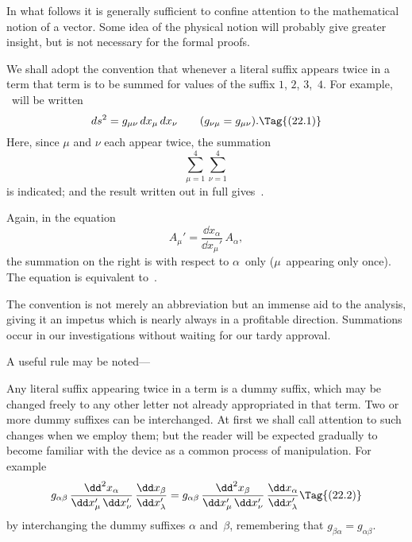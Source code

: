 \documentclass[12pt]{book}
\begin{document}
In what follows it is generally sufficient to confine attention to the mathematical
notion of a vector. Some idea of the physical notion will probably
give greater insight, but is not necessary for the formal proofs.

%

We shall adopt the convention that whenever a literal suffix appears twice
in a term that term is to be summed for values of the suffix $1$, $2$, $3$,~$4$. For
example, ~will be written
\[
ds^{2} = g_{\mu\nu}\, dx_{\mu}\, dx_{\nu}\qquad (g_{\nu\mu} = g_{\mu\nu}).
\Tag{(22.1)}
\]
Here, since $\mu$ and $\nu$ each appear twice, the summation
\[
\sum_{\mu=1}^{4} \sum_{\nu=1}^{4}
\]
is indicated; and the result written out in full gives~.

Again, in the equation
\[
A_{\mu}' = \frac{\dd x_{\alpha}}{\dd x_{\mu}'}\, A_{\alpha},
\]
the summation on the right is with respect to $\alpha$~only ($\mu$~appearing only once).
The equation is equivalent to~.

The convention is not merely an abbreviation but an immense aid to the
analysis, giving it an impetus which is nearly always in a profitable direction.
Summations occur in our investigations without waiting for our tardy approval.

A useful rule may be noted---

Any literal suffix appearing twice in a term is a dummy suffix, which may
be changed freely to any other letter not already appropriated in that term.
Two or more dummy suffixes can be interchanged\footnotemark.\footnotetext
  {At first we shall call attention to such changes when we employ them; but the reader will
  be expected gradually to become familiar with the device as a common process of manipulation.}
For example
%
\[
g_{\alpha\beta}\, \frac{\dd^{2} x_{\alpha}}{\dd x_{\mu}'\, \dd x_{\nu}'}\, \frac{\dd x_{\beta}}{\dd x_{\lambda}'}
= g_{\alpha\beta}\, \frac{\dd^{2} x_{\beta}}{\dd x_{\mu}'\, \dd x_{\nu}'}\, \frac{\dd x_{\alpha}}{\dd x_{\lambda}'}
\Tag{(22.2)}
\]
{\Loosen by interchanging the dummy suffixes $\alpha$ and~$\beta$, remembering that $g_{\beta\alpha} = g_{\alpha\beta}$.}
\end{document}
